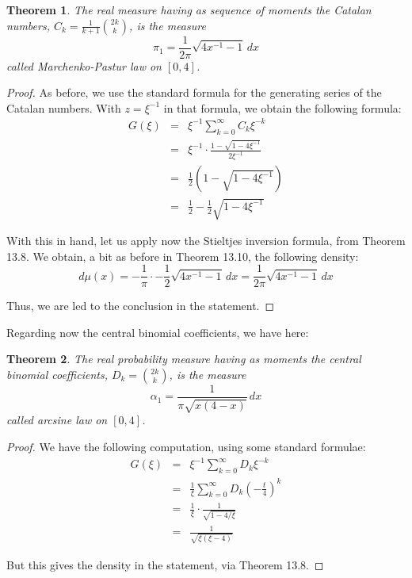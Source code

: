 \documentclass[12pt]{amsbook}
\newtheorem{theorem}{Theorem}[chapter]
\begin{document}
\begin{theorem}
The real measure having as sequence of moments the Catalan numbers, $C_k=\frac{1}{k+1}\binom{2k}{k}$, is the measure
$$\pi_1=\frac{1}{2\pi}\sqrt{4x^{-1}-1}\,dx$$
called Marchenko-Pastur law on $[0,4]$.
\end{theorem}

\begin{proof}
As before, we use the standard formula for the generating series of the Catalan numbers. With $z=\xi^{-1}$ in that formula, we obtain the following formula:
\begin{eqnarray*}
G(\xi)
&=&\xi^{-1}\sum_{k=0}^\infty C_k\xi^{-k}\\
&=&\xi^{-1}\cdot\frac{1-\sqrt{1-4\xi^{-1}}}{2\xi^{-1}}\\
&=&\frac{1}{2}\left(1-\sqrt{1-4\xi^{-1}}\right)\\
&=&\frac{1}{2}-\frac{1}{2}\sqrt{1-4\xi^{-1}}
\end{eqnarray*}

With this in hand, let us apply now the Stieltjes inversion formula, from Theorem 13.8. We obtain, a bit as before in Theorem 13.10, the following density:
$$d\mu(x)
=-\frac{1}{\pi}\cdot-\frac{1}{2}\sqrt{4x^{-1}-1}\,dx
=\frac{1}{2\pi}\sqrt{4x^{-1}-1}\,dx$$

Thus, we are led to the conclusion in the statement.
\end{proof}

Regarding now the central binomial coefficients, we have here:


\begin{theorem}
The real probability measure having as moments the central binomial coefficients, $D_k=\binom{2k}{k}$, is the measure
$$\alpha_1=\frac{1}{\pi\sqrt{x(4-x)}}\,dx$$
called arcsine law on $[0,4]$.
\end{theorem}

\begin{proof}
We have the following computation, using some standard formulae:
\begin{eqnarray*}
G(\xi)
&=&\xi^{-1}\sum_{k=0}^\infty D_k\xi^{-k}\\
&=&\frac{1}{\xi}\sum_{k=0}^\infty D_k\left(-\frac{t}{4}\right)^k\\
&=&\frac{1}{\xi}\cdot\frac{1}{\sqrt{1-4/\xi}}\\
&=&\frac{1}{\sqrt{\xi(\xi-4)}} 
\end{eqnarray*}

But this gives the density in the statement, via Theorem 13.8. 
\end{proof}
\end{document}
